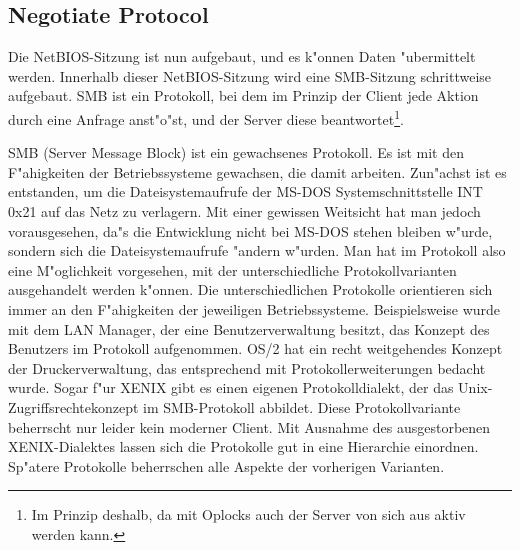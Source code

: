 \documentclass{scrartcl}\usepackage{pslatex}\typearea{12}
\begin{document}
\subsection{Negotiate Protocol}

Die NetBIOS-Sitzung ist nun aufgebaut, und es k"onnen Daten
"ubermittelt werden. Innerhalb dieser NetBIOS-Sitzung wird eine
SMB-Sitzung schrittweise aufgebaut. SMB ist ein Protokoll, bei dem im
Prinzip der Client jede Aktion durch eine Anfrage anst"o"st, und der
Server diese beantwortet\footnote{Im Prinzip deshalb, da mit Oplocks
  auch der Server von sich aus aktiv werden kann.}.

SMB (Server Message Block) ist ein gewachsenes Protokoll. Es ist mit
den F"ahigkeiten der Betriebssysteme gewachsen, die damit arbeiten.
Zun"achst ist es entstanden, um die Dateisystemaufrufe der MS-DOS
Systemschnittstelle INT 0x21 auf das Netz zu verlagern. Mit einer
gewissen Weitsicht hat man jedoch vorausgesehen, da"s die Entwicklung
nicht bei MS-DOS stehen bleiben w"urde, sondern sich die
Dateisystemaufrufe "andern w"urden. Man hat im Protokoll also eine
M"oglichkeit vorgesehen, mit der unterschiedliche Protokollvarianten
ausgehandelt werden k"onnen. Die unterschiedlichen Protokolle
orientieren sich immer an den F"ahigkeiten der jeweiligen
Betriebssysteme. Beispielsweise wurde mit dem LAN Manager, der eine
Benutzerverwaltung besitzt, das Konzept des Benutzers im Protokoll
aufgenommen. OS/2 hat ein recht weitgehendes Konzept der
Druckerverwaltung, das entsprechend mit Protokollerweiterungen bedacht
wurde. Sogar f"ur XENIX gibt es einen eigenen Protokolldialekt, der
das Unix-Zugriffsrechtekonzept im SMB-Protokoll abbildet. Diese
Protokollvariante beherrscht nur leider kein moderner Client. Mit
Ausnahme des ausgestorbenen XENIX-Dialektes lassen sich die Protokolle
gut in eine Hierarchie einordnen. Sp"atere Protokolle beherrschen alle
Aspekte der vorherigen Varianten.
\end{document}

